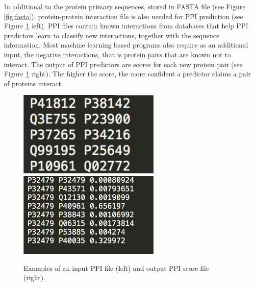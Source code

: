 In additional to the protein primary sequences, stored in FASTA file (see Figure \ref{fig:fasta}), protein-protein interaction file is also needed for PPI prediction (see Figure \ref{fig_ppi_input_output} left). PPI files contain known interactions from databases that help PPI predictors learn to classify new interactions, together with the sequence information. Most machine learning based programs also require as an additional input, the negative interactions, that is protein pairs that are known not to interact. The output of PPI predictors are scores for each new protein pair (see Figure \ref{fig_ppi_input_output} right). The higher the score, the more confident a predictor claims a pair of proteins interact.
\begin{figure}[h!]
\begin{center}
\includegraphics[width=7cm]{img/ppi_file.png}
\includegraphics[width=7cm]{img/result_interactome.png}
\end{center}
\caption[Examples of an input PPI file and output PPI score file]{Examples of an input PPI file (left) and output PPI score file (right). \label{fig_ppi_input_output}}
\end{figure}

